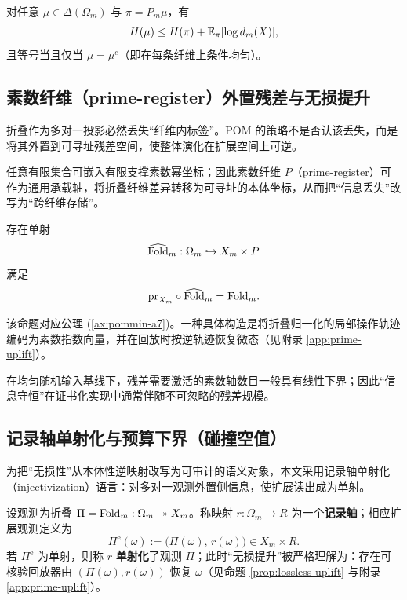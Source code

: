 \begin{corollary}\label{cor:maxent}
对任意 $\mu\in\Delta(\Omega_m)$ 与 $\pi=P_m\mu$，有
$$
H(\mu)\le H(\pi)+\mathbb{E}_\pi[\log d_m(X)],
$$
且等号当且仅当 $\mu=\mu^e$（即在每条纤维上条件均匀）。
\end{corollary}

\subsection{素数纤维（prime-register）外置残差与无损提升}
折叠作为多对一投影必然丢失“纤维内标签”。POM 的策略不是否认该丢失，而是将其外置到可寻址残差空间，使整体演化在扩展空间上可逆。

\begin{definition}[素数承载残差]\label{def:prime-residual}
任意有限集合可嵌入有限支撑素数幂坐标；因此素数纤维 $P$（prime-register）可作为通用承载轴，将折叠纤维差异转移为可寻址的本体坐标，从而把“信息丢失”改写为“跨纤维存储”。
\end{definition}

\begin{proposition}[无损折叠提升的存在]\label{prop:lossless-uplift}
存在单射
$$
\widehat{\mathrm{Fold}}_m:\Omega_m\hookrightarrow X_m\times P
$$
满足
$$
\mathrm{pr}_{X_m}\circ\widehat{\mathrm{Fold}}_m = \mathrm{Fold}_m.
$$
\end{proposition}

该命题对应公理 (\ref{ax:pommin-a7})。一种具体构造是将折叠归一化的局部操作轨迹编码为素数指数向量，并在回放时按逆轨迹恢复微态（见附录 \ref{app:prime-uplift}）。
\begin{remark}
在均匀随机输入基线下，残差需要激活的素数轴数目一般具有线性下界；因此“信息守恒”在证书化实现中通常伴随不可忽略的残差规模。
\end{remark}

\subsection{记录轴单射化与预算下界（碰撞空值）}\label{subsec:injectivization-budget}
为把“无损性”从本体性逆映射改写为可审计的语义对象，本文采用记录轴单射化（injectivization）语言：对多对一观测外置侧信息，使扩展读出成为单射。\par

\begin{definition}[记录轴与单射化扩展]\label{def:record-axis-injectivization}
设观测为折叠 $\Pi=\mathrm{Fold}_m:\Omega_m\twoheadrightarrow X_m$。称映射 $r:\Omega_m\to R$ 为一个\textbf{记录轴}；相应扩展观测定义为
$$
\Pi^{\mathrm e}(\omega):=\bigl(\Pi(\omega),\,r(\omega)\bigr)\in X_m\times R.
$$
若 $\Pi^{\mathrm e}$ 为单射，则称 $r$ \textbf{单射化}了观测 $\Pi$；此时“无损提升”被严格理解为：存在可核验回放器由 $(\Pi(\omega),r(\omega))$ 恢复 $\omega$（见命题 \ref{prop:lossless-uplift} 与附录 \ref{app:prime-uplift}）。
\end{definition}

